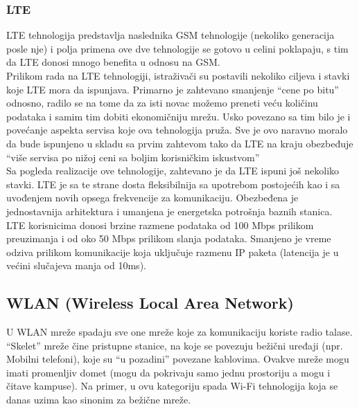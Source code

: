 \documentclass[a4paper]{article}
\begin{document}
        \subsubsection{LTE}
LTE tehnologija predstavlja naslednika GSM tehnologije (nekoliko generacija posle nje) i polja primena ove dve tehnologije se gotovo u celini poklapaju, s tim da LTE donosi mnogo benefita u odnosu na GSM.\\
Prilikom rada na LTE tehnologiji, istraživači su postavili nekoliko ciljeva i stavki koje LTE mora da ispunjava. Primarno je zahtevano smanjenje “cene po bitu” odnosno, radilo se na tome da za isti novac možemo preneti veću količinu podataka i samim tim dobiti ekonomičniju mrežu. Usko povezano sa tim bilo je i povećanje aspekta servisa koje ova tehnologija pruža. Sve je ovo naravno moralo da bude ispunjeno u skladu sa prvim zahtevom tako da LTE na kraju obezbeđuje “više servisa po nižoj ceni sa boljim korisničkim iskustvom”\\
Sa pogleda realizacije ove tehnologije, zahtevano je da LTE ispuni još nekoliko stavki. LTE je sa te strane dosta fleksibilnija sa upotrebom postojećih kao i sa uvođenjem novih opsega frekvencije za komunikaciju. Obezbeđena je jednostavnija arhitektura i umanjena je energetska potrošnja baznih stanica.\\
LTE korisnicima donosi brzine razmene podataka od 100 Mbps prilikom preuzimanja i od oko 50 Mbps prilikom slanja podataka. Smanjeno je vreme odziva prilikom komunikacije koja uključuje razmenu IP paketa (latencija je u većini slučajeva manja od 10ms).

    \subsection{WLAN (Wireless Local Area Network)}
U WLAN mreže spadaju sve one mreže koje za komunikaciju koriste radio talase. “Skelet” mreže čine pristupne stanice, na koje se povezuju bežični uređaji (npr. Mobilni telefoni), koje su “u pozadini” povezane kablovima. Ovakve mreže mogu imati promenljiv domet (mogu da pokrivaju samo jednu prostoriju a mogu i čitave kampuse). Na primer, u ovu kategoriju spada Wi-Fi tehnologija koja se danas uzima kao sinonim za bežične mreže.
\end{document}

